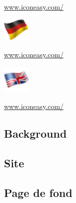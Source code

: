 \documentclass[12pt,a4paper]{article}
\begin{document}
   \begin{minipage}{0.5\textwidth}
     \url{ www.iconeasy.com/}
   \end{minipage}


   \begin{minipage}{0.5\textwidth}
     \includegraphics[width=0.1\textwidth]{../WRET/Images/germanFlag.png}\\
   \end{minipage} 
        
   \begin{minipage}{0.5\textwidth}
       \url{www.iconeasy.com/}
   \end{minipage}



   \begin{minipage}{0.5\textwidth}
   \includegraphics[width=0.1\textwidth]{../WRET/Images/English-Language-Flag-3-icon.png}\\
   \end{minipage} 
        
   \begin{minipage}{0.5\textwidth}
     \url{  www.iconeasy.com/}
   \end{minipage}






\subsection{Background}
\subsection{Site}
\subsection{Page de fond}
\end{document}
